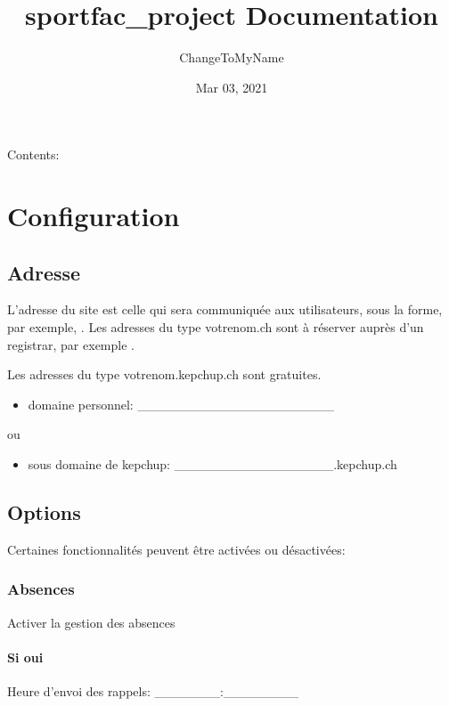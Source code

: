 \documentclass[letterpaper,10pt,english]{sphinxmanual}
\title{sportfac_project Documentation}
\date{Mar 03, 2021}
\author{ChangeToMyName}
\begin{document}
\pagestyle{empty}
\sphinxmaketitle
\pagestyle{plain}
\sphinxtableofcontents
\pagestyle{normal}
\label{\detokenize{index::doc}}


Contents:


\chapter{Configuration}
\label{\detokenize{configurer:configuration}}\label{\detokenize{configurer::doc}}
\noindent{}


\section{Adresse}
\label{\detokenize{configurer:adresse}}
L’adresse du site est celle qui sera communiquée aux utilisateurs, sous la forme, par exemple, .
Les adresses du type votrenom.ch sont à réserver auprès d’un registrar, par exemple .

Les adresses du type votrenom.kepchup.ch sont gratuites.
\begin{itemize}
\item {} 
domaine personnel: \_\_\_\_\_\_\_\_\_\_\_\_\_\_\_\_\_\_\_\_\_

\end{itemize}

ou
\begin{itemize}
\item {} 
sous domaine de kepchup: \_\_\_\_\_\_\_\_\_\_\_\_\_\_\_\_\_.kepchup.ch

\end{itemize}


\section{Options}
\label{\detokenize{configurer:options}}
Certaines fonctionnalités peuvent être activées ou désactivées:


\subsection{Absences}
\label{\detokenize{configurer:absences}}
 Activer la gestion des absences


\subsubsection{Si oui}
\label{\detokenize{configurer:si-oui}}
Heure d’envoi des rappels: \_\_\_\_\_\_\_:\_\_\_\_\_\_\_\_
\end{document}
